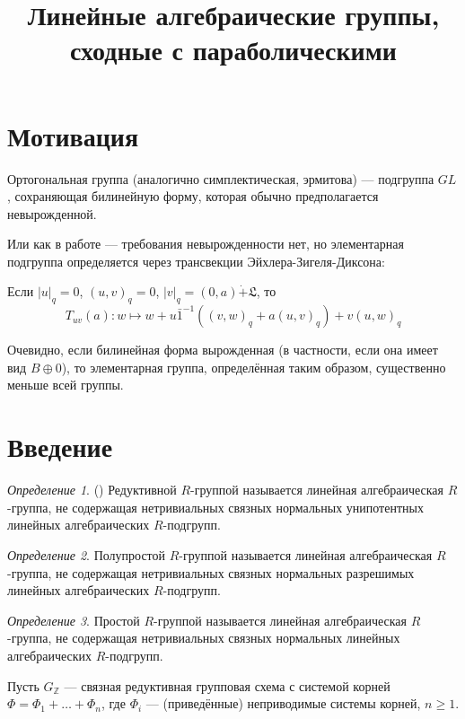 \documentclass[10pt]{article}
\title{Линейные алгебраические группы, сходные с параболическими}
\author{}
\date{}
\theoremstyle{break}
\theoremstyle{remark}
\newtheorem{definition}{Определение}
\newcommand{\Z}{\mathbb{Z}}
\renewcommand{\ge}{\geqslant}
\begin{document}
\maketitle


\section{Мотивация}

Ортогональная группа (аналогично симплектическая, эрмитова) --- подгруппа $GL$, сохраняющая билинейную форму, которая обычно предполагается невырожденной.

Или как в работе \cite{Petrov2005} --- требования невырожденности нет, но элементарная подгруппа определяется через трансвекции Эйхлера-Зигеля-Диксона:

Если $ |u|_q = 0 $, $(u,v)_q = 0$, $|v|_q = (0, a) \dot{+} \mathfrak{L}$, то
$$ T_{uv}(a) : w \mapsto w + u \bar{1}^{-1} ((v,w)_q + a(u,v)_q) + v (u,w)_q $$

Очевидно, если билинейная форма вырожденная (в частности, если она имеет вид $B \oplus 0$), то элементарная группа, определённая таким образом, существенно меньше всей группы.



\section{Введение}

\begin{definition} (\cite{Conrad11reductivegroup})
Редуктивной $R$-группой называется линейная алгебраическая $R$-группа, не содержащая нетривиальных связных нормальных унипотентных линейных алгебраических $R$-подгрупп.
\end{definition}

\begin{definition}
Полупростой $R$-группой называется линейная алгебраическая $R$-группа, не содержащая нетривиальных связных нормальных разрешимых линейных алгебраических $R$-подгрупп.
\end{definition}

\begin{definition}
Простой $R$-группой называется линейная алгебраическая $R$-группа, не содержащая нетривиальных связных нормальных линейных алгебраических $R$-подгрупп.
\end{definition}

Пусть $G_\Z$ --- связная редуктивная групповая схема с системой корней $\Phi = \Phi_1 + \dots + \Phi_n$, где $\Phi_i$ --- (приведённые) неприводимые системы корней, $n \ge 1$.
\end{document}
